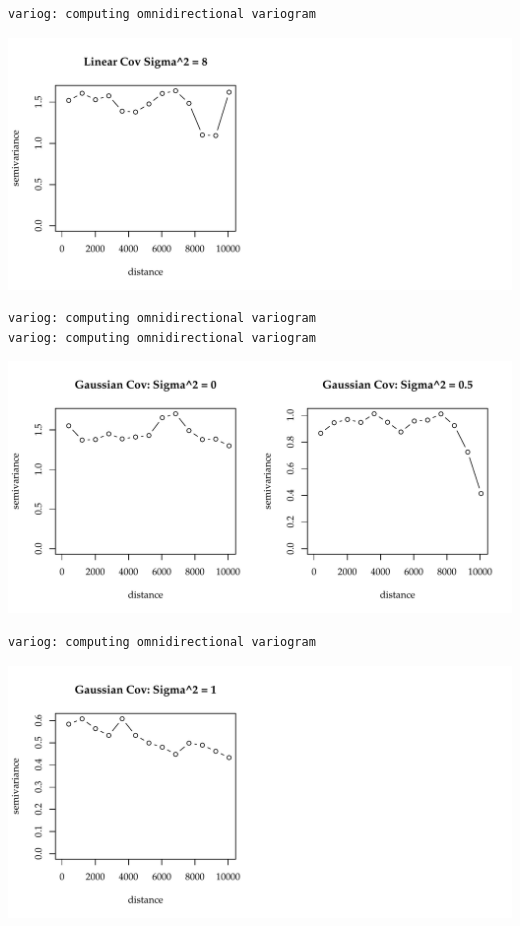 \documentclass{article}\usepackage[]{graphicx}\usepackage[]{color}
\makeatletter
\def\maxwidth{ %
  \ifdim\Gin@nat@width>\linewidth
    \linewidth
  \else
    \Gin@nat@width
  \fi
}
\newenvironment{kframe}{%
 \def\at@end@of@kframe{}%
 \ifinner\ifhmode%
  \def\at@end@of@kframe{\end{minipage}}%
  \begin{minipage}{\columnwidth}%
 \fi\fi%
 \def\FrameCommand##1{\hskip\@totalleftmargin \hskip-\fboxsep
 \colorbox{shadecolor}{##1}\hskip-\fboxsep
     \hskip-\linewidth \hskip-\@totalleftmargin \hskip\columnwidth}%
 \MakeFramed {\advance\hsize-\width
   \@totalleftmargin\z@ \linewidth\hsize
   \@setminipage}}%
 {\par\unskip\endMakeFramed%
 \at@end@of@kframe}
\newenvironment{knitrout}{}{} %
\makeatother
\begin{document}
\begin{knitrout}
{}


\begin{kframe}\begin{verbatim}
variog: computing omnidirectional variogram
\end{verbatim}
\end{kframe}

{\centering \includegraphics[width=\maxwidth]{figure/sims_se-6} 

}


\begin{kframe}\begin{verbatim}
variog: computing omnidirectional variogram
variog: computing omnidirectional variogram
\end{verbatim}
\end{kframe}

{\centering \includegraphics[width=\maxwidth]{figure/sims_se-7} 

}


\begin{kframe}\begin{verbatim}
variog: computing omnidirectional variogram
\end{verbatim}
\end{kframe}

{\centering \includegraphics[width=\maxwidth]{figure/sims_se-8} 

}
\end{knitrout}
\end{document}
